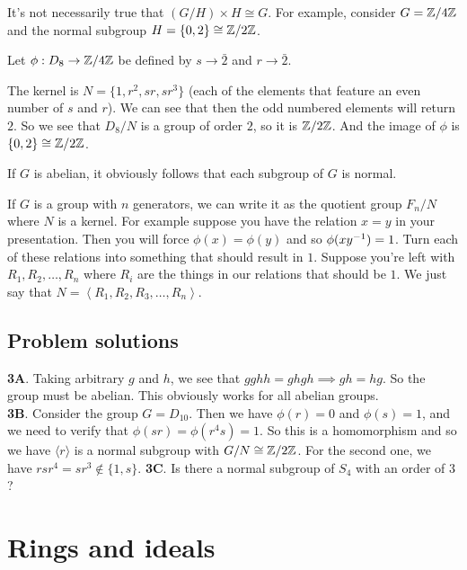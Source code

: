 \documentclass[11pt]{scrreport}
\begin{document}
\begin{example}
    It's not necessarily true that $(G/H)\times H \cong G$. For example, consider $G=\mathbb Z/4\mathbb Z$ and the normal subgroup $H=\{0,2\} \cong \mathbb Z/2\mathbb Z$.
\end{example}
\begin{example}
    Let $\phi: D_8 \to \mathbb Z/4\mathbb Z$ be defined by $s\to \bar 2$ and $r \to \bar 2$.

    The kernel is $N=\{1,r^2,sr,sr^3\}$ (each of the elements that feature an even number of $s$ and $r$). We can see that then the odd numbered elements will return $2$. So we see that $D_8 / N$ is a group of order $2$, so it is $\mathbb Z/2\mathbb Z$. And the image of $\phi$ is $\{0,2\}\cong \mathbb Z/2\mathbb Z$.
\end{example}
\begin{remark}
    If $G$ is abelian, it obviously follows that each subgroup of $G$ is normal.
\end{remark}
\begin{remark}
    If $G$ is a group with $n$ generators, we can write it as the quotient group $F_n/N$ where $N$ is a kernel. For example suppose you have the relation $x=y$ in your presentation. Then you will force $\phi(x)=\phi(y)$ and so $\phi(xy^{-1})=1$. Turn each of these relations into something that should result in $1$. Suppose you're left with $R_1, R_2, \dots, R_n$ where $R_i$ are the things in our relations that should be $1$. We just say that $N=\left<R_1,R_2,R_3,\dots, R_n\right>.$
\end{remark}
\section{Problem solutions}
\textbf{3A}. Taking arbitrary $g$ and $h$, we see that $gghh = ghgh \implies gh=hg$. So the group must be abelian. This obviously works for all abelian groups.\\
\textbf{3B}. Consider the group $G=D_{10}$. Then we have $\phi(r)=0$ and $\phi(s)=1$, and we need to verify that $\phi(sr)=\phi(r^4s)=1$. So this is a homomorphism and so we have $\langle r \rangle$ is a normal subgroup with $G/N \cong \mathbb Z/2\mathbb Z$. For the second one, we have $rsr^4 = sr^3 \notin \{1,s\}$.
\textbf{3C}. Is there a normal subgroup of $S_4$ with an order of $3$?
\chapter{Rings and ideals}
\end{document}
